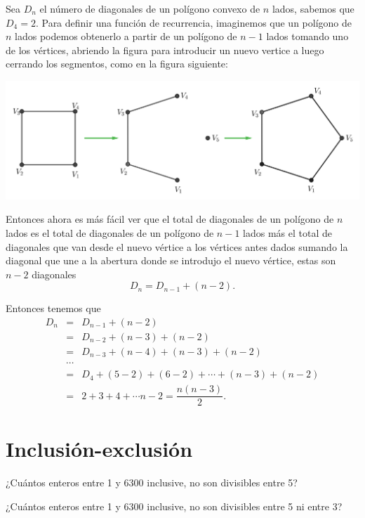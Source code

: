\begin{solucion}
    Sea $D_n$ el número de diagonales de un polígono convexo de $n$ lados, sabemos que $D_4=2$. Para definir una función de recurrencia, imaginemos que un polígono de $n$ lados podemos obtenerlo a partir de un polígono de $n-1$ lados tomando uno de los vértices, abriendo la figura para introducir un nuevo vertice a luego cerrando los segmentos, como en la figura siguiente:
    \begin{center}
        \includegraphics[scale=1]{Imagenes/IMG2/S1-2-04.png}
    \end{center}

    Entonces ahora es más fácil ver que el total de diagonales de un polígono de $n$ lados es el total de diagonales de un polígono de $n-1$ lados más el total de diagonales que van desde el nuevo vértice a los vértices antes dados sumando la diagonal que une a la abertura donde se introdujo el nuevo vértice, estas son $n-2$ diagonales $$D_n= D_{n-1}+(n-2).$$

    Entonces tenemos que 
    \begin{eqnarray*}
        D_n &=& D_{n-1}+(n-2)\\
        &=& D_{n-2}+(n-3)+(n-2)\\
        &=& D_{n-3}+(n-4)+(n-3)+(n-2)\\
        &\cdots& \\
        &=& D_4+(5-2)+(6-2)+\cdots +(n-3)+(n-2)\\
        &=& 2+3+4+\cdots n-2=\dfrac{n(n-3)}{2}.
    \end{eqnarray*}
\end{solucion}
\section{Inclusión-exclusión}

\begin{problema}
¿Cuántos enteros entre 1 y 6300 inclusive, no son divisibles entre 5?
\end{problema}


\begin{problema}
¿Cuántos enteros entre 1 y 6300 inclusive, no son divisibles entre 5 ni entre 3?
\end{problema}


